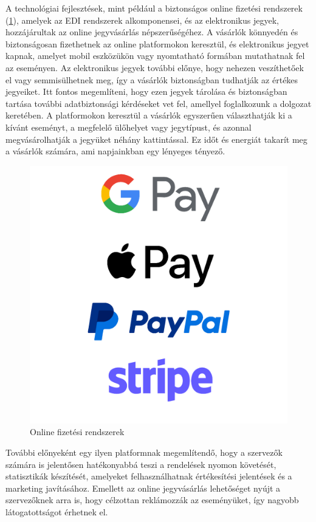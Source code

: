 A technológiai fejlesztések, mint például a biztonságos online fizetési rendszerek (\ref{abra:Logok}), amelyek az EDI rendszerek alkomponensei, és az elektronikus jegyek, hozzájárultak az online jegyvásárlás népszerűségéhez. A vásárlók könnyedén és biztonságosan fizethetnek az online platformokon keresztül, és elektronikus jegyet kapnak, amelyet mobil eszközükön vagy nyomtatható formában mutathatnak fel az eseményen. Az elektronikus jegyek további előnye, hogy nehezen veszíthetőek el vagy semmisülhetnek meg, így a vásárlók biztonságban tudhatják az értékes jegyeiket. Itt fontos megemlíteni, hogy ezen jegyek tárolása és biztonságban tartása további adatbiztonsági kérdéseket vet fel, amellyel foglalkozunk a dolgozat keretében. A platformokon keresztül a vásárlók egyszerűen választhatják ki a kívánt eseményt, a megfelelő ülőhelyet vagy jegytípust, és azonnal megvásárolhatják a jegyüket néhány kattintással. Ez időt és energiát takarít meg a vásárlók számára, ami napjainkban egy lényeges tényező.

\begin{figure}[!h]
	\centering
	\includegraphics[scale=0.2]{images/logok}
	\caption{Online fizetési rendszerek}
	\label{abra:Logok}
\end{figure}
\pagebreak

További előnyeként egy ilyen platformnak megemlítendő, hogy a szervezők számára is jelentősen hatékonyabbá teszi a rendelések nyomon követését, statisztikák készítését, amelyeket felhasználhatnak értékesítési jelentések és a marketing javításához. Emellett az online jegyvásárlás lehetőséget nyújt a szervezőknek arra is, hogy célzottan reklámozzák az eseményüket, így nagyobb látogatottságot érhetnek el.

